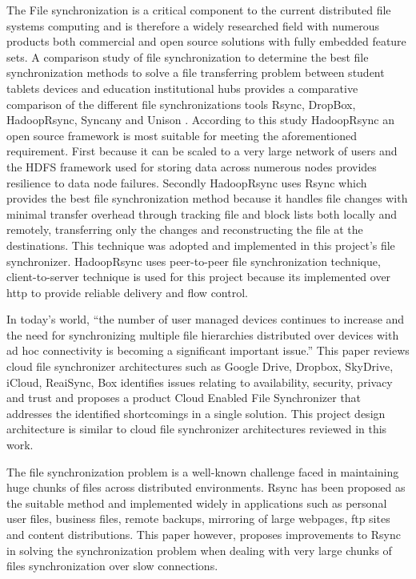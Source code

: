 \documentclass[11pt]{article}
\begin{document}
The File synchronization is a critical component to the current distributed file systems computing and is therefore a widely researched field with numerous products both commercial and open source solutions with fully embedded feature sets. A comparison study of file synchronization to determine the best file synchronization methods to solve a file transferring problem between student tablets devices and education institutional hubs provides a comparative comparison of the different file synchronizations tools Rsync, DropBox, HadoopRsync, Syncany and Unison \cite{shiala:15}. According to this study HadoopRsync an open source framework is most suitable for meeting the aforementioned requirement. First because it can be scaled to a very large network of users and the HDFS framework used for storing data across numerous nodes provides resilience to data node failures. Secondly HadoopRsync uses Rsync \cite{suel:14} which provides the best file synchronization method because it handles file changes with minimal transfer overhead through tracking file and block lists both locally and remotely, transferring only the changes and reconstructing the file at the destinations. This technique was adopted and implemented in this project’s file synchronizer. HadoopRsync uses peer-to-peer file synchronization technique, client-to-server technique is used for this project because its implemented over http to provide reliable delivery and flow control.

In today’s world, “the number of user managed devices continues to increase and the need for synchronizing multiple file hierarchies distributed over devices with ad hoc connectivity is becoming a significant important issue.” \cite{shaikh:04} This paper reviews cloud file synchronizer architectures such as Google Drive, Dropbox, SkyDrive, iCloud, ReaiSync, Box identifies issues relating to availability, security, privacy and trust and proposes a product Cloud Enabled File Synchronizer that addresses the identified shortcomings in a single solution. This project design architecture is similar to cloud file synchronizer architectures reviewed in this work.

The file synchronization problem is a well-known challenge faced in maintaining huge chunks of files across distributed environments. Rsync \cite{shiala:15}\cite{shaikh:04} has been proposed as the suitable method and implemented widely in applications such as personal user files, business files, remote backups, mirroring of large webpages, ftp sites and content distributions. This paper \cite{shaikh:04} however, proposes improvements to Rsync in solving the synchronization problem when dealing with very large chunks of files synchronization over slow connections.
\end{document}
